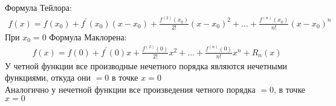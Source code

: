 		\subsection{}
		Формула Тейлора:
		\begin{gather*}
			f(x) = f(x_0) + f^{\prime}(x_0)(x - x_0) + \frac{f^{(2)}(x_0)}{2!}(x - x_0)^2 + \ldots + \frac{f^{(n)}(x_0)}{n!}(x - x_0)^n
		\end{gather*}
		При $x_0 = 0$ Формула Маклорена:
		\begin{gather*}
			f(x) = f(0) + f^{\prime}(0)x + \frac{f^{(2)}(0)}{2!}x^2 + \ldots + \frac{f^{(n)}(0)}{n!}x^n + R_n(x)
		\end{gather*}
		У четной функции все производные нечетного порядка являются нечетными функциями, откуда они $ = 0$ в точке $x = 0$\\
		Аналогично у нечетной функции все произведения четного порядка $ = 0$, в точке $x = 0$
